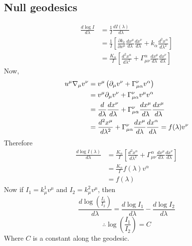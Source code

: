 \documentclass{article}
\begin{document}
		\subsection{Null geodesics}
		\begin{align*}
			\frac{d \log I}{d\lambda} &= \frac{1}{I} \frac{dI(\lambda)}{d\lambda} \\
			&= \frac{1}{I} \left[ \frac{\partial k_\nu}{\partial x^\mu} \frac{dx^\mu}{d\lambda} \frac{dx^\nu}{d\lambda} + k_\alpha \frac{d^2 x^\alpha}{d\lambda^2}\right] \\
			&= \frac{K_\alpha}{I} \left[ \frac{d^2 x^\alpha}{d\lambda^2} + \Gamma_{\mu\nu}^\alpha \frac{dx^\mu}{d\lambda} \frac{dx^\nu}{d\lambda}\right]
		\end{align*}
		Now,
		\begin{align*}
			u^\mu \nabla_\mu v^\nu &= v^\mu \left( \partial_\mu v^\nu + \Gamma_{\mu\alpha}^\nu v^\alpha \right) \\
			&= v^\mu \partial_\mu v^\nu + \Gamma_{\mu\alpha}^\nu v^\mu v^\alpha \\
			&= \frac{d}{d\lambda} \frac{dx^\nu}{d\lambda} + \Gamma_{\mu\alpha}^\nu \frac{dx^\mu}{d\lambda} \frac{dx^\mu}{d\lambda} \\
			&= \frac{d^2 x^\mu}{d\lambda^2} + \Gamma_{\mu\alpha}^\nu \frac{dx^\mu}{d\lambda} \frac{dx^\alpha}{d\lambda} = f(\lambda) v^\nu
		\end{align*}
		Therefore
		\begin{align*}
			\frac{d \log I(\lambda)}{d\lambda} &= \frac{K_\alpha}{I} \left[ \frac{d^2 x^\alpha}{d\lambda^2} + \Gamma_{\mu\nu}^\alpha \frac{dx^\mu}{d\lambda}  \frac{dx^\nu}{d\lambda}\right] \\
			&= \frac{K_\alpha}{I} f(\lambda)v^\alpha \\
			&= f(\lambda) 
		\end{align*}
		Now if $I_1 = k_\mu^1 v^\mu$ and $I_2 = k_\mu^2 v^\mu$, then 
		$$ 	\frac{d \log \left(\frac{I_1}{I_2}\right)}{d\lambda} = 	\frac{d \log I_1}{d\lambda} - \frac{d \log I_2}{d\lambda}$$
		$$ \therefore \log \left( \frac{I_1}{I_2}\right) = C$$
		Where $C$ is a constant along the geodesic.
	\pagebreak
\end{document}

